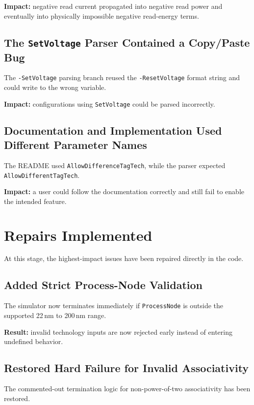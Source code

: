 \documentclass[11pt]{article}
\begin{document}
\textbf{Impact:} negative read current propagated into negative read power and eventually into physically impossible negative read-energy terms.

\subsection{The \texttt{SetVoltage} Parser Contained a Copy/Paste Bug}

The \texttt{-SetVoltage} parsing branch reused the \texttt{-ResetVoltage} format string and could write to the wrong variable.

\textbf{Impact:} configurations using \texttt{SetVoltage} could be parsed incorrectly.

\subsection{Documentation and Implementation Used Different Parameter Names}

The README used \texttt{AllowDifferenceTagTech}, while the parser expected \texttt{AllowDifferentTagTech}.

\textbf{Impact:} a user could follow the documentation correctly and still fail to enable the intended feature.

\section{Repairs Implemented}

At this stage, the highest-impact issues have been repaired directly in the code.

\subsection{Added Strict Process-Node Validation}

The simulator now terminates immediately if \texttt{ProcessNode} is outside the supported 22\,nm to 200\,nm range.

\textbf{Result:} invalid technology inputs are now rejected early instead of entering undefined behavior.

\subsection{Restored Hard Failure for Invalid Associativity}

The commented-out termination logic for non-power-of-two associativity has been restored.
\end{document}
